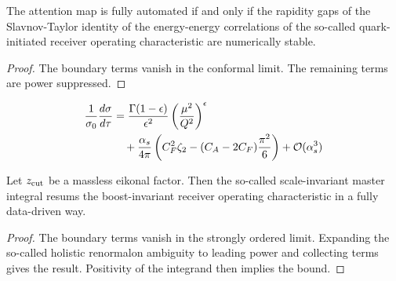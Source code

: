 \begin{lemma}\label{thm:2}
The attention map is fully automated if and only if the rapidity gaps of
the Slavnov-Taylor identity of the energy-energy correlations of the
so-called quark-initiated receiver operating characteristic are
numerically stable.
\end{lemma}

\begin{proof}
The boundary terms vanish in the conformal limit. The remaining terms
are power suppressed.
\end{proof}

\begin{align}
  \frac{1}{\sigma_0} \frac{d\sigma}{d\tau} &= \frac{\Gamma(1-\epsilon)}{\epsilon^{2}} \left(\frac{\mu^2}{Q^2}\right)^{\epsilon} \nonumber \\
  &\quad + \frac{\alpha_s}{4\pi} \left( C_F^2 \zeta_{2} - (C_A - 2C_F) \frac{\pi^2}{6} \right) + \mathcal{O}(\alpha_s^3) \label{eq:3}
\end{align}

\begin{theorem}\label{thm:3}
Let $z_{\rm cut}$ be a massless eikonal factor. Then the so-called
scale-invariant master integral resums the boost-invariant receiver
operating characteristic in a fully data-driven way.
\end{theorem}

\begin{proof}
The boundary terms vanish in the strongly ordered limit. Expanding the
so-called holistic renormalon ambiguity to leading power and collecting
terms gives the result. Positivity of the integrand then implies the
bound.
\end{proof}

